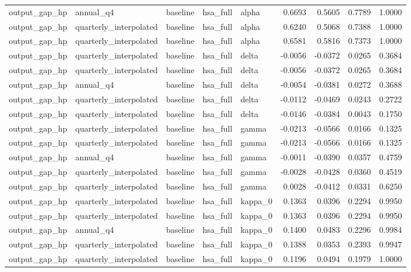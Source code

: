\begin{tabular}{lllllrrrr}
output\_gap\_hp & annual\_q4 & baseline & hsa\_full & alpha & 0.6693 & 0.5605 & 0.7789 & 1.0000 \\
output\_gap\_hp & quarterly\_interpolated & baseline & hsa\_full & alpha & 0.6240 & 0.5068 & 0.7388 & 1.0000 \\
output\_gap\_hp & quarterly\_interpolated & baseline & hsa\_full & alpha & 0.6581 & 0.5816 & 0.7373 & 1.0000 \\
output\_gap\_hp & quarterly\_interpolated & baseline & hsa\_full & delta & -0.0056 & -0.0372 & 0.0265 & 0.3684 \\
output\_gap\_hp & quarterly\_interpolated & baseline & hsa\_full & delta & -0.0056 & -0.0372 & 0.0265 & 0.3684 \\
output\_gap\_hp & annual\_q4 & baseline & hsa\_full & delta & -0.0054 & -0.0381 & 0.0272 & 0.3688 \\
output\_gap\_hp & quarterly\_interpolated & baseline & hsa\_full & delta & -0.0112 & -0.0469 & 0.0243 & 0.2722 \\
output\_gap\_hp & quarterly\_interpolated & baseline & hsa\_full & delta & -0.0146 & -0.0384 & 0.0043 & 0.1750 \\
output\_gap\_hp & quarterly\_interpolated & baseline & hsa\_full & gamma & -0.0213 & -0.0566 & 0.0166 & 0.1325 \\
output\_gap\_hp & quarterly\_interpolated & baseline & hsa\_full & gamma & -0.0213 & -0.0566 & 0.0166 & 0.1325 \\
output\_gap\_hp & annual\_q4 & baseline & hsa\_full & gamma & -0.0011 & -0.0390 & 0.0357 & 0.4759 \\
output\_gap\_hp & quarterly\_interpolated & baseline & hsa\_full & gamma & -0.0028 & -0.0428 & 0.0360 & 0.4519 \\
output\_gap\_hp & quarterly\_interpolated & baseline & hsa\_full & gamma & 0.0028 & -0.0412 & 0.0331 & 0.6250 \\
output\_gap\_hp & quarterly\_interpolated & baseline & hsa\_full & kappa\_0 & 0.1363 & 0.0396 & 0.2294 & 0.9950 \\
output\_gap\_hp & quarterly\_interpolated & baseline & hsa\_full & kappa\_0 & 0.1363 & 0.0396 & 0.2294 & 0.9950 \\
output\_gap\_hp & annual\_q4 & baseline & hsa\_full & kappa\_0 & 0.1400 & 0.0483 & 0.2296 & 0.9984 \\
output\_gap\_hp & quarterly\_interpolated & baseline & hsa\_full & kappa\_0 & 0.1388 & 0.0353 & 0.2393 & 0.9947 \\
output\_gap\_hp & quarterly\_interpolated & baseline & hsa\_full & kappa\_0 & 0.1196 & 0.0494 & 0.1979 & 1.0000 \\

\end{tabular}
